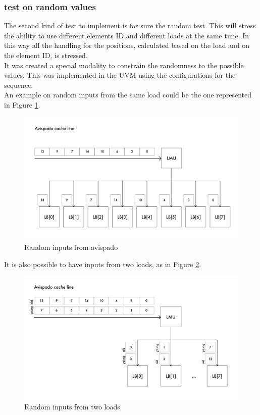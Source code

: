 \subsubsection{test on random values}
The second kind of test to implement is for sure the random test. This will stress the ability to use different elements ID and different loads at the same time. In this way all the handling for the positions, calculated based on the load and on the element ID, is stressed.\\

It was created a special modality to constrain the randomness to the possible values. This was implemented in the UVM using the configurations for the sequence.\\

An example on random inputs from the same load could be the one represented in Figure \ref{cache-to-lb-rnd-ex}.

\begin{figure}[H]
    \centering
    \includegraphics[scale = 0.6]{Chapter_2/img/cache-to-lb-rnd-ex.png}
    \caption{Random inputs from avispado}
    \label{cache-to-lb-rnd-ex}
\end{figure}

It is also possible to have inputs from two loads, as in Figure \ref{cache-to-lb-ooo-ex}.

\begin{figure}[H]
    \centering
    \includegraphics[scale = 0.6]{Chapter_2/img/cache-to-lb-ooo-ex.png}
    \caption{Random inputs from two loads}
    \label{cache-to-lb-ooo-ex}
\end{figure}

